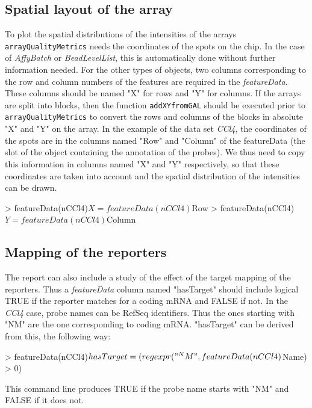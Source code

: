 \documentclass[a4paper]{article}
\newcommand{\Rclass}[1]{\textit{#1}}
\newcommand{\Rfunction}[1]{{\small\texttt{#1}}}
\begin{document}
\subsection{Spatial layout of the array}

To plot the spatial distributions of the intensities of the arrays \Rfunction{arrayQualityMetrics} needs the
coordinates of the spots on the chip. In the case of \Rclass{AffyBatch} or \Rclass{BeadLevelList}, this is automatically done without further information needed. For the other types of objects, two columns corresponding to the row and 
column numbers of the features are required in the \Rclass{featureData}. These columns
should be named "X" for rows and "Y" for columns. If the arrays are split into blocks, then the function \Rfunction{addXYfromGAL} should be executed prior to \Rfunction{arrayQualityMetrics} to convert the rows and columns of the blocks in absolute "X" and "Y" on the array. In the example of the data set \emph{CCl4}, the coordinates of the spots are in the columns named "Row" and "Column" of the featureData (the slot of the object containing the annotation of the probes). We thus need to copy this information in columns named "X" and "Y" respectively, so that these coordinates are taken into account and the spatial distribution of the intensities can be drawn.

%
\begin{Schunk}
\begin{Sinput}
> featureData(nCCl4)$X = featureData(nCCl4)$Row
> featureData(nCCl4)$Y = featureData(nCCl4)$Column
\end{Sinput}
\end{Schunk}
%

\subsection{Mapping of the reporters}

The report can also include a study of the effect of the target mapping of the reporters. Thus a \Rclass{featureData} column named "hasTarget" should include logical TRUE if the reporter matches for a coding mRNA and FALSE if not. In the \emph{CCl4} case, probe names can be RefSeq identifiers. Thus the ones starting with "NM" are the one corresponding to coding mRNA. "hasTarget" can be derived from this, the following way:

%
\begin{Schunk}
\begin{Sinput}
> featureData(nCCl4)$hasTarget = (regexpr("^NM", featureData(nCCl4)$Name) > 0)
\end{Sinput}
\end{Schunk}
%
This command line produces TRUE if the probe name starts with "NM" and FALSE if it does not.
\end{document}
